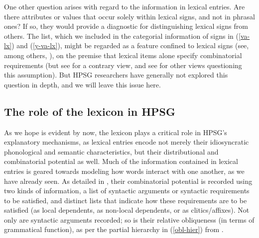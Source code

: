 \documentclass[output=paper
 	        ,biblatex
                ,babelshorthands
                ,newtxmath
                ,draftmode
                ,colorlinks, citecolor=brown
]{langscibook}
\begin{document}
One other question arises with regard to the information in lexical entries.
Are there attributes or values that occur solely within lexical signs, and not in phrasal ones? 
If so, they would provide a diagnostic for distinguishing lexical signs from others.
The  list, which we included in the categorial information of signs in (\ref{va-lx}) and (\ref{y-va-lx}), might be regarded as a feature confined to lexical signs (see, among others, \citealt[361]{GinzburgandSag2001}), on the premise that lexical items alone specify combinatorial requirements (but see \citealt{Przepiorkowski2001} for a contrary view, and see  for other views questioning this assumption).
But HPSG researchers have generally not explored this question in depth, and we will leave this issue here.


\subsection{The role of the lexicon in HPSG}

As we hope is evident by now, the lexicon plays a critical role in HPSG's explanatory mechanisms, as lexical entries encode not merely their idiosyncratic phonological and semantic characteristics, but their distributional and combinatorial potential as well.
Much of the information contained in lexical entries is geared towards modeling how words interact with one another, as we have already seen. 
As detailed in , their combinatorial potential is recorded using two kinds of information, 
a list of syntactic arguments or syntactic requirements to be satisfied, and distinct lists that indicate how these requirements are to be satisfied (as local dependents, as non-local dependents, or as clitics/affixes).
Not only are syntactic arguments recorded; so is their relative obliqueness (in terms of grammatical function), as per the partial hierarchy in (\ref{obl-hier}) from \citet[]{PollardandSag1992}. 
\end{document}
